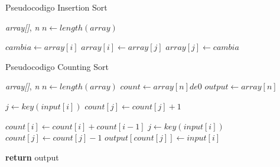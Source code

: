 \begin{algorithm}
\caption{Pseudocodigo Insertion Sort}
\label{alg:label}
\begin{algorithmic}
{\textit{array[]},\textit{ n}}
\State $n \gets length(array)$



\State $cambia \gets array[i]$
\State $array[i] \gets array[j]$
\State $array[j] \gets cambia$
\EndIf

\EndFor

\EndFor

\EndFunction
\end{algorithmic}
\end{algorithm}



\begin{algorithm}
\vspace{1cm}
\caption{Pseudocodigo Counting Sort}
\label{alg:label}
\begin{algorithmic}
{\textit{array[]},\textit{ n}}
\State $n \gets length(array)$
\State $count \gets array[n] de 0$
\State $output \gets array[n]$

\State $j \gets key(input[i])$
\State $count[j] \gets count[j] + 1$
\EndFor
\vspace{0.2cm}

\State $count[i] \gets count[i] + count[i - 1]$
\EndFor
\vspace{0.2cm}
\State $j \gets key(input[i])$
\State $count[j] \gets count[j] - 1$
\State $output[count[j]] \gets input[i]$
\EndFor

\textbf{return} output
\EndFunction
\end{algorithmic}
\end{algorithm}

